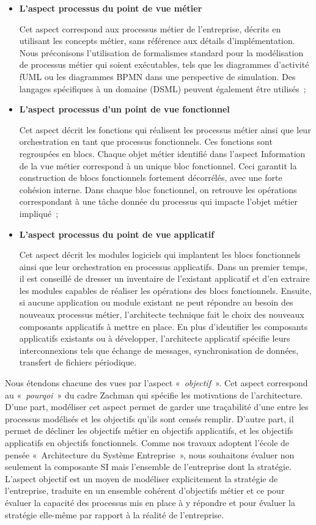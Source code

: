 	\begin{itemize}
	\item \textbf{L'aspect processus du point de vue métier} 
	
	Cet aspect correspond aux processus métier de l'entreprise, décrits en utilisant les concepts métier, sans référence aux détails d'implémentation. Nous préconisons l'utilisation de formalismes standard pour la modélisation de processus métier qui soient exécutables, tels que les diagrammes d'activité fUML ou les diagrammes BPMN dans une perspective de simulation. Des langages spécifiques à un domaine (DSML) peuvent également être utilisés~;
	\item \textbf{L'aspect processus d'un point de vue fonctionnel} 
	
	Cet aspect décrit les fonctions qui réalisent les processus métier ainsi que leur orchestration en tant que processus fonctionnels. Ces fonctions sont regroupées en blocs. Chaque objet métier identifié dans l'aspect Information de la vue métier correspond à un unique bloc fonctionnel. Ceci garantit la construction de blocs fonctionnels fortement décorrélés, avec une forte cohésion interne. Dans chaque bloc fonctionnel, on retrouve les opérations correspondant à une tâche donnée du processus qui impacte l'objet métier impliqué~;
	\item \textbf{L'aspect processus du point de vue applicatif}
	
	Cet aspect décrit les modules logiciels qui implantent les blocs fonctionnels ainsi que leur orchestration en processus applicatifs. Dans un premier temps, il est conseillé de dresser un inventaire de l'existant applicatif et d'en extraire les modules capables de réaliser les opérations des blocs fonctionnels. Ensuite, si aucune application ou module existant ne peut répondre au besoin des nouveaux processus métier, l'architecte technique fait le choix des nouveaux composants applicatifs à mettre en place. En plus d'identifier les composants applicatifs existants ou à développer, l'architecte applicatif spécifie leurs interconnexions tels que échange de messages, synchronisation de données, transfert de fichiers périodique.
	\end{itemize}
	
Nous étendons chacune des vues par l'aspect «~\textit{objectif}~». Cet aspect correspond au «~\textit{pourqoi}~» du cadre Zachman qui spécifie les motivations de l'architecture. D'une part, modéliser cet aspect permet de garder une traçabilité d'une entre les processus modélisés et les objectifs qu'ils sont censés remplir. D'autre part, il permet de décliner les objectifs métier en objectifs applicatifs, et les objectifs applicatifs en objectifs fonctionnels. Comme nos travaux adoptent l'école de pensée «~Architecture du Système Entreprise~», nous souhaitons évaluer non seulement la composante SI mais l'ensemble de l'entreprise dont la stratégie. L'aspect objectif est un moyen de modéliser explicitement la stratégie de l'entreprise, traduite en un ensemble cohérent d'objectifs métier et ce pour évaluer la capacité des processus mis en place à y répondre et pour évaluer la stratégie elle-même par rapport à la réalité de l'entreprise. 

